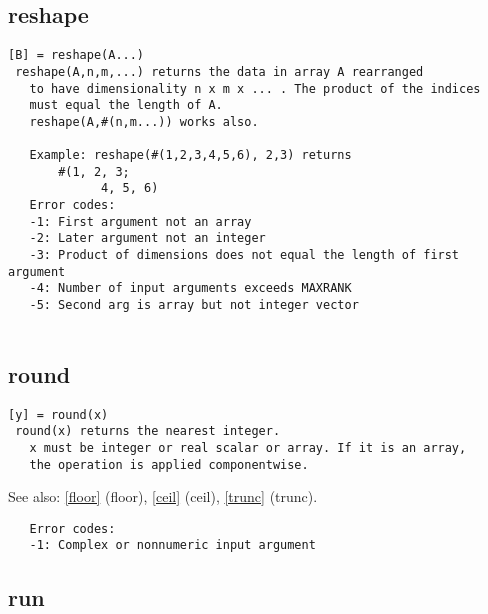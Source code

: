 \documentclass[a4paper]{article}
\begin{document}
\subsection{reshape\label{reshape}}

\begin{tscreen}
\begin{verbatim}
[B] = reshape(A...)
 reshape(A,n,m,...) returns the data in array A rearranged
   to have dimensionality n x m x ... . The product of the indices
   must equal the length of A.
   reshape(A,#(n,m...)) works also.

   Example: reshape(#(1,2,3,4,5,6), 2,3) returns
       #(1, 2, 3;
             4, 5, 6)  
   Error codes:
   -1: First argument not an array
   -2: Later argument not an integer
   -3: Product of dimensions does not equal the length of first argument
   -4: Number of input arguments exceeds MAXRANK
   -5: Second arg is array but not integer vector
   
\end{verbatim}
\end{tscreen}



\subsection{round\label{round}}

\begin{tscreen}
\begin{verbatim}
[y] = round(x)
 round(x) returns the nearest integer.
   x must be integer or real scalar or array. If it is an array,
   the operation is applied componentwise.
\end{verbatim}

See also: \ref{floor} {(floor)}, \ref{ceil} {(ceil)}, \ref{trunc} {(trunc)}.
\begin{verbatim}
   Error codes:
   -1: Complex or nonnumeric input argument 
\end{verbatim}
\end{tscreen}



\subsection{run\label{run}}
\end{document}
